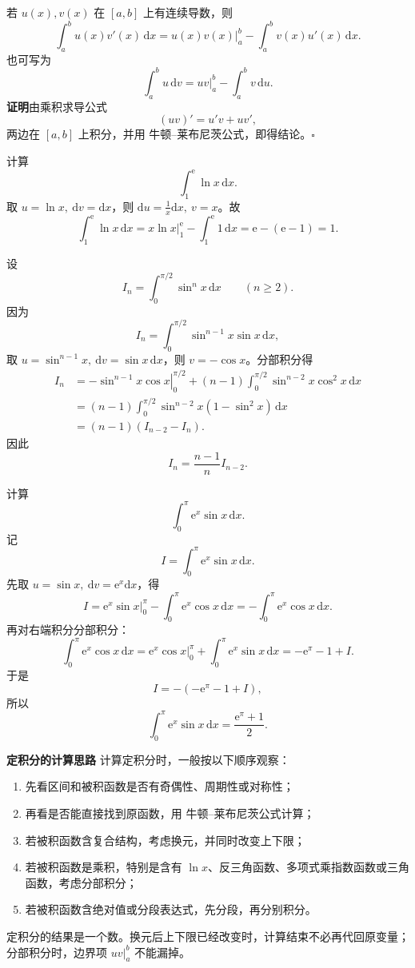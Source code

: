 \documentclass[fontset=fandol]{ctexart}
\newenvironment{custom}[1]{\par\noindent\textbf{#1}\quad}{\par\vspace{0.8em}}
\newcommand{\dd}{\mathrm{d}}
\newcommand{\ee}{\mathrm{e}}
\begin{document}
\begin{theorem}[定积分的分部积分公式]
若 $u(x),v(x)$ 在 $[a,b]$ 上有连续导数，则
\[
\int_a^b u(x)v'(x)\,\dd x
=\left.u(x)v(x)\right|_a^b-\int_a^b v(x)u'(x)\,\dd x.
\]
也可写为
\[
\int_a^b u\,\dd v=\left.uv\right|_a^b-\int_a^b v\,\dd u.
\]
\textbf{证明}\quad 由乘积求导公式
\[
(uv)'=u'v+uv',
\]
两边在 $[a,b]$ 上积分，并用 牛顿--莱布尼茨公式，即得结论。\hfill$\square$
\end{theorem}

\begin{example}[对数函数]
计算
\[
\int_1^\ee\ln x\,\dd x.
\]
取 $u=\ln x,\ \dd v=\dd x$，则 $\dd u=\frac1x\dd x,\ v=x$。故
\[
\int_1^\ee\ln x\,\dd x
=\left.x\ln x\right|_1^\ee-\int_1^\ee1\,\dd x
=\ee-(\ee-1)=1.
\]
\end{example}

\begin{example}[含参数的递推型]
设
\[
I_n=\int_0^{\pi/2}\sin^n x\,\dd x\qquad(n\geq2).
\]
因为
\[
I_n=\int_0^{\pi/2}\sin^{n-1}x\sin x\,\dd x,
\]
取 $u=\sin^{n-1}x,\ \dd v=\sin x\,\dd x$，则 $v=-\cos x$。分部积分得
\[
\begin{aligned}
I_n
&=\left.-\sin^{n-1}x\cos x\right|_0^{\pi/2}
+(n-1)\int_0^{\pi/2}\sin^{n-2}x\cos^2x\,\dd x\\
&=(n-1)\int_0^{\pi/2}\sin^{n-2}x(1-\sin^2x)\,\dd x\\
&=(n-1)(I_{n-2}-I_n).
\end{aligned}
\]
因此
\[
I_n=\frac{n-1}{n}I_{n-2}.
\]
\end{example}

\begin{example}[连续两次分部积分]
计算
\[
\int_0^\pi \ee^x\sin x\,\dd x.
\]
记
\[
I=\int_0^\pi \ee^x\sin x\,\dd x.
\]
先取 $u=\sin x,\ \dd v=\ee^x\dd x$，得
\[
I=\left.\ee^x\sin x\right|_0^\pi-\int_0^\pi \ee^x\cos x\,\dd x
=-\int_0^\pi \ee^x\cos x\,\dd x.
\]
再对右端积分分部积分：
\[
\int_0^\pi \ee^x\cos x\,\dd x
=\left.\ee^x\cos x\right|_0^\pi+\int_0^\pi \ee^x\sin x\,\dd x
=-\ee^\pi-1+I.
\]
于是
\[
I=-(-\ee^\pi-1+I),
\]
所以
\[
\int_0^\pi \ee^x\sin x\,\dd x=\frac{\ee^\pi+1}{2}.
\]
\end{example}

\begin{custom}{定积分的计算思路}
计算定积分时，一般按以下顺序观察：
\begin{enumerate}
\item 先看区间和被积函数是否有奇偶性、周期性或对称性；
\item 再看是否能直接找到原函数，用 牛顿--莱布尼茨公式计算；
\item 若被积函数含复合结构，考虑换元，并同时改变上下限；
\item 若被积函数是乘积，特别是含有 $\ln x$、反三角函数、多项式乘指数函数或三角函数，考虑分部积分；
\item 若被积函数含绝对值或分段表达式，先分段，再分别积分。
\end{enumerate}
定积分的结果是一个数。换元后上下限已经改变时，计算结束不必再代回原变量；分部积分时，边界项 $\left.uv\right|_a^b$ 不能漏掉。
\end{custom}
\end{document}
